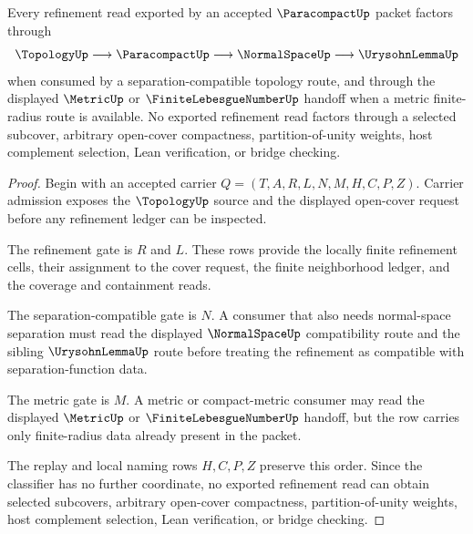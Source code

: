\begin{theorem}
\label{thm:paracompact-refinement-consumer-route}
Every refinement read exported by an accepted $\ParacompactUp$ packet factors through
$$
\TopologyUp \longrightarrow \ParacompactUp \longrightarrow \NormalSpaceUp \longrightarrow \UrysohnLemmaUp
$$
when consumed by a separation-compatible topology route, and through the displayed $\MetricUp$ or $\FiniteLebesgueNumberUp$ handoff when a metric finite-radius route is available. No exported refinement read factors through a selected subcover, arbitrary open-cover compactness, partition-of-unity weights, host complement selection, Lean verification, or bridge checking.
\end{theorem}
\begin{proof}
Begin with an accepted carrier $Q=(T,A,R,L,N,M,H,C,P,Z)$. Carrier admission exposes the $\TopologyUp$ source and the displayed open-cover request before any refinement ledger can be inspected.

The refinement gate is $R$ and $L$. These rows provide the locally finite refinement cells, their assignment to the cover request, the finite neighborhood ledger, and the coverage and containment reads.

The separation-compatible gate is $N$. A consumer that also needs normal-space separation must read the displayed $\NormalSpaceUp$ compatibility route and the sibling $\UrysohnLemmaUp$ route before treating the refinement as compatible with separation-function data.

The metric gate is $M$. A metric or compact-metric consumer may read the displayed $\MetricUp$ or $\FiniteLebesgueNumberUp$ handoff, but the row carries only finite-radius data already present in the packet.

The replay and local naming rows $H,C,P,Z$ preserve this order. Since the classifier has no further coordinate, no exported refinement read can obtain selected subcovers, arbitrary open-cover compactness, partition-of-unity weights, host complement selection, Lean verification, or bridge checking.
\end{proof}

